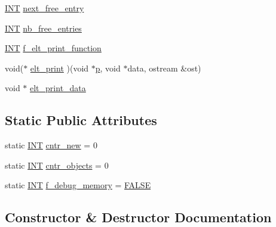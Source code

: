 \begin{DoxyCompactItemize}
\item 
\mbox{\hyperlink{galois_8h_a09fddde158a3a20bd2dcadb609de11dc}{I\+NT}} \mbox{\hyperlink{classpage__storage_a257b73b8ff27046486893f84f29cc87e}{next\+\_\+free\+\_\+entry}}
\item 
\mbox{\hyperlink{galois_8h_a09fddde158a3a20bd2dcadb609de11dc}{I\+NT}} \mbox{\hyperlink{classpage__storage_adf0cb1e4d8dc128c60485eb6ef649de5}{nb\+\_\+free\+\_\+entries}}
\item 
\mbox{\hyperlink{galois_8h_a09fddde158a3a20bd2dcadb609de11dc}{I\+NT}} \mbox{\hyperlink{classpage__storage_a603209f68b698b9b380368cf1134a90f}{f\+\_\+elt\+\_\+print\+\_\+function}}
\item 
void($\ast$ \mbox{\hyperlink{classpage__storage_aa21cef3dca005352aa9e447ab5070c85}{elt\+\_\+print}} )(void $\ast$\mbox{\hyperlink{alphabet2_8_c_a533391314665d6bf1b5575e9a9cd8552}{p}}, void $\ast$data, ostream \&ost)
\item 
void $\ast$ \mbox{\hyperlink{classpage__storage_aec80ee934d016857f972cfd2e95a7344}{elt\+\_\+print\+\_\+data}}
\end{DoxyCompactItemize}
\subsection*{Static Public Attributes}
\begin{DoxyCompactItemize}
\item 
static \mbox{\hyperlink{galois_8h_a09fddde158a3a20bd2dcadb609de11dc}{I\+NT}} \mbox{\hyperlink{classpage__storage_aad11c2d56adeaa7037d69e68180c98cc}{cntr\+\_\+new}} = 0
\item 
static \mbox{\hyperlink{galois_8h_a09fddde158a3a20bd2dcadb609de11dc}{I\+NT}} \mbox{\hyperlink{classpage__storage_afaf83e3f8575169ddff61549609fb4d5}{cntr\+\_\+objects}} = 0
\item 
static \mbox{\hyperlink{galois_8h_a09fddde158a3a20bd2dcadb609de11dc}{I\+NT}} \mbox{\hyperlink{classpage__storage_a42cf780f4063211e452fa47431d125b1}{f\+\_\+debug\+\_\+memory}} = \mbox{\hyperlink{nauty_8h_aa93f0eb578d23995850d61f7d61c55c1}{F\+A\+L\+SE}}
\end{DoxyCompactItemize}


\subsection{Constructor \& Destructor Documentation}
\mbox{\label{classpage__storage_a7887e879ddae5516015edd4acc04fee8}} 
